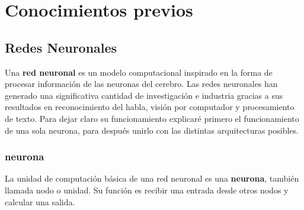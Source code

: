 \documentclass[12,twoside]{TFG-GM}
\theoremstyle{definition}
\theoremstyle{remark}
\begin{document}
\section{Conocimientos previos}
%
%


\subsection{Redes Neuronales}
Una \textbf{red neuronal} es un modelo computacional inspirado en la forma de procesar información de las neuronas del cerebro. Las redes neuronales han generado una significativa cantidad de investigación e industria gracias a sus resultados en reconocimiento del habla, visión por computador y procesamiento de texto. Para dejar claro su funcionamiento explicaré primero el funcionamiento de una sola neurona, para después unirlo con las distintas arquitecturas posibles. 

\subsubsection{neurona}

La unidad de computación básica de una red neuronal es una \textbf{neurona}, también llamada nodo o unidad. Su función es recibir una entrada desde otros nodos y calcular una salida. 
\end{document}
